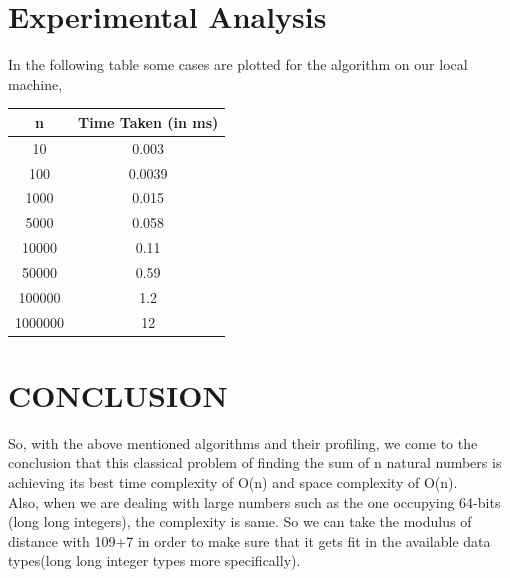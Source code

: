 \documentclass[10pt]{article}
\begin{document}
\begin{multicols*}{2}
\section*{Experimental Analysis}
In the following table some cases are plotted for the algorithm on our local machine,
\begin{center}
 \begin{tabular}{||c | c||} 
 \hline
 n & Time Taken (in ms) \\ [0.5ex] 
 \hline\hline
 10 & 0.003 \\ 
 \hline
 100 & 0.0039 \\
 \hline
 1000 & 0.015 \\
 \hline
 5000 & 0.058 \\
 \hline
 10000 & 0.11 \\
 \hline
 50000 & 0.59 \\
 \hline
 100000 & 1.2 \\
 \hline
 1000000 & 12 \\ [1ex] 
 \hline
\end{tabular}
\end{center}


\section*{CONCLUSION}

So, with the above mentioned algorithms and their profiling, we come to the conclusion that this classical problem of finding the sum of n natural numbers is achieving its best time complexity of O(n) and space complexity of O(n).\\Also, when we are dealing with large numbers such as the one occupying 64-bits (long long integers), the complexity is same. So we can take the modulus of distance with 109+7 in order to make sure that it gets fit in the available data types(long long integer types more specifically).



\end{multicols*}
\end{document}
